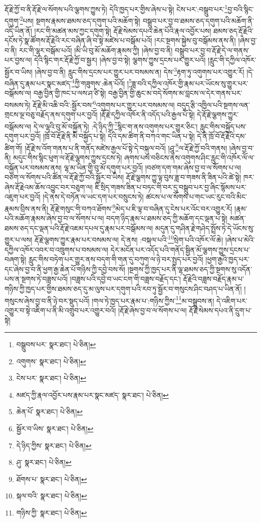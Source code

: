 རྡོ་རྗེ་ཀྱོ་བ་ནི་རྡོ་རྗེ་ལ་སོགས་པའི་ལྕགས་ཀྱུས་ཏེ། དེའི་ཁྱད་པར་གྱིས་ཞེས་པ་སྟེ། ངེས་པར་:བསྒྲུབ་པར་\footnote{བསྒྲུབས་པར་  སྣར་ཐང་།  པེ་ཅིན། }བྱ་བའི་སྙིང་དགུག་\footnote{འགུགས་  སྣར་ཐང་།  པེ་ཅིན། }པས། སྔགས་རྣམས་ཐམས་ཅད་དགུག་པའི་མཆོག་སྟེ། བསྒྲུབ་པར་བྱ་བ་ཐམས་ཅད་དགུག་པའི་མཆོག་ནི་འདི་ཡིན་ནོ། །རང་གི་མཚན་མས་ཀྱང་དགུག་སྟེ། རྡོ་རྗེ་སེམས་དཔའ་ཆེན་པོའི་རྣལ་འབྱོར་པས། ཐམས་ཅད་རྡོ་རྗེའི་དངོས་ཏེ་སྣ་ཚོགས་རྡོ་རྗེའི་རང་བཞིན་ཞི་བ་སྟེ་མཛེས་པ་བསྒོམ་པའོ། །རང་སྔགས་སྐྱེས་བུ་བསྒོམས་ནས་ནི། །ཞེས་བྱ་བ་ནི། རང་གི་ལྷར་བསྒོམ་པའོ། །མི་ཡི་བུ་མོ་མཆོག་རྣམས་ཀྱི། །ཞེས་བྱ་བ་ནི། བསྒྲུབ་པར་བྱ་བ་རྡོ་རྗེ་དེ་ལ་གནས་པར་བྱས་ལ། དེའི་སྙིང་གར་རྡོ་རྗེ་ཀྱོ་བ་སྦྱར། །ཞེས་བྱ་བ་སྟེ། ལྕགས་ཀྱུས་དྲངས་པར་གྱུར་པའོ། །རླུང་གི་དཀྱིལ་འཁོར་སྦྱོར་བ་ཡིས། །ཞེས་བྱ་བ་ནི། རླུང་གིས་དྲངས་པར་གྱུར་པར་བསམས་ན། དེས་\footnote{ངེས་པར་  སྣར་ཐང་།  པེ་ཅིན། }རྟག་ཏུ་འགུགས་པར་འགྱུར་རོ། །དེ་བཞིན་དུ་རྣམ་པར་སྣང་མཛད་\footnote{མཛད་ཀྱི་རྣལ་འབྱོར་པས་རྣམ་པར་སྣང་མཛད་  སྣར་ཐང་།  པེ་ཅིན། }ཀྱི་གཟུགས་:ཆེན་པོའོ། །\footnote{ཆེན་པོ་  སྣར་ཐང་།  པེ་ཅིན། }ཟླ་བའི་དཀྱིལ་འཁོར་གྱི་རྣམ་པར་ཡོངས་སུ་གྱུར་པར་བསྒོམས་ལ། བརྒྱ་བྱིན་གྱི་ཁང་པ་ལས་ཤ་ཙི་སྟེ། བརྒྱ་བྱིན་གྱི་ཆུང་མ་བདེ་སོགས་མ་བླངས་ལ་དེར་གནས་པར་བསམས་ཏེ། རྡོ་རྗེ་མི་འཆི་བའི་:སྦྱོར་བས་\footnote{སྦྱོར་བ་ཡིས་  སྣར་ཐང་།  པེ་ཅིན། }འགུགས་པར་གྱུར་པར་བསམས་ལ། བདུད་རྩི་འཁྱིལ་པའི་སྔགས་ལན་གྲངས་ལྔ་བཅུ་བརྗོད་ནས་དགུག་པར་བྱའོ། །རྡོ་རྗེ་དཀྱིལ་འཁོར་ནི་འདོད་པའི་རྒྱལ་པོ་སྟེ། དེ་རྡོ་རྗེ་ལྕགས་ཀྱུར་བསྒོམས་ལ། དེ་ལ་ལྷའི་བུ་མོ་བསྐྱོན་ཏེ། :དེ་ཉིད་ཀྱི་\footnote{དེ་ཉིད་ཀྱིས་  སྣར་ཐང་།  པེ་ཅིན། }སྙིང་ག་ནས་འགུགས་པར་གྱུར་ཅིང་། རླུང་གིས་བསྐྱོད་པས་དགུག་པར་བྱའོ། །ཁྲོ་བོ་རྡོ་རྗེ་ནི་མི་བསྐྱོད་པ་སྟེ། དེའི་དམ་ཚིག་ནི་བཀའ་གང་ཡིན་པ་སྟེ། དེ་ནི་ཁྲོ་བོ་རྡོ་རྗེའི་དམ་ཚིག་གོ། །རྡོ་རྗེ་ས་འོག་གནས་པ་ནི་གནོད་མཛེས་རྒྱལ་པོ་སྟེ་དེ་བསྐུལ་བའོ། །ཤཱུ་\footnote{ཤུ་  སྣར་ཐང་།  པེ་ཅིན། }ལ་རྡོ་རྗེ་ཀྱོ་བའི་གནས། །ཞེས་བྱ་བ་ནི། མདུང་གིས་སྙིང་ཕུག་ལ་རྡོ་རྗེ་ལྕགས་ཀྱུས་དྲངས་ཏེ། ཞགས་པས་བཅིངས་ནས་འགུགས་ཤིང་རླུང་གི་འཁོར་ལོ་ལ་བསྐྱོན་པར་བསམས་ནས། ལྷ་མ་ཡིན་གྱི་བུ་མོ་དགུག་པར་བྱའོ། །བཙག་དག་གམ་ཞེས་བྱ་བ་ལ་སོགས་པ་ལ། བཙག་ལ་སོགས་པའི་ཚོན་ལ་རྡོ་རྗེ་ཀྱོ་བའི་སྦྱོར་བ་ཡིས། རྡོ་རྗེ་ལྕགས་ཀྱུ་ལྟ་བུས་ཟླ་བ་གཟས་ནི་ཟིན་པའི་ཚེ་སྟེ། ཁར་ཞེས་རྡོ་རྗེའམ་ཆོས་འབྱུང་བར་བཅུག་ལ། ཇི་སྲིད་གཟས་ཟིན་པ་བཏང་གི་བར་དུ་བསྒྲུབ་པར་བྱ་ཞིང་སྙོམས་པར་འཇུག་པར་བྱའོ། །དེ་ནས་དེ་བཏོན་ལ་ཡང་དག་པར་བསྲུངས་ཏེ། ཚངས་པ་ལ་སོགས་པ་གང་ཡང་རུང་བའི་མིང་རྣམས་བྲིས་ནས་ནི། རྡོ་རྗེ་གསུང་གི་བཀའ་ཐོགས་\footnote{ཐོགས་པ་  སྣར་ཐང་།  པེ་ཅིན། }མེད་པ་ཇི་ལྟ་བ་བཞིན་དུ་ངེས་པར་འོང་བར་འགྱུར་རོ། །རྣམ་པའི་མཆོག་རྣམས་ཞེས་བྱ་བ་ལ་སོགས་པ་ལ། བདག་ཉིད་རྣམ་པ་ཐམས་ཅད་ཀྱི་མཆོག་དང་ལྡན་པ་སྟེ། མཚན་ཐམས་ཅད་དང་ལྡན་པའི་རྡོ་རྗེ་འཇམ་དཔལ་དུ་རྣམ་པར་བསྒོམས་ལ། མདུན་དུ་གཤིན་རྗེ་གཤེད་སྤྲོས་ཏེ་དེ་ཡོངས་སུ་གྱུར་པ་ལས། རྡོ་རྗེ་ལྕགས་ཀྱུར་རྣམ་པར་བསམས་ལ། དེ་ནས། :བསྐལ་པའི་\footnote{སྐལ་བའི་  སྣར་ཐང་།  པེ་ཅིན། }སྲེག་པའི་འཁོར་ལོ་ཆེ། །ཞེས་པ་མེའི་དཀྱིལ་འཁོར་འབར་བ་འཁྲུགས་པ་བསམས་ལ། དེར་མངོན་པར་འདོད་པའི་གནོད་སྦྱིན་མོ་ལྕགས་ཀྱུས་དྲངས་པ་བཞག་སྟེ། རླུང་གིས་བཏེག་པར་གྱུར་ནས་བདག་གི་གན་དུ་བཀུག་ལ་ཉེ་བར་སྤྱད་པར་བྱའོ། །ཕྱག་རྒྱའི་ཁྱད་པར་དང་ཞེས་བྱ་བ་ནི་ཕྱག་རྒྱ་ཆེན་པོ་གཉིས་ཀྱི་དབྱེ་བས་སོ། །སྔགས་ཀྱི་ཁྱད་པར་ནི་ལྷ་ཐམས་ཅད་ཀྱི་སྔགས་སུ་འདོན་པས་ན་སྔགས་ཏེ་བཟླས་པའོ། །བཟླས་པའི་དབྱེ་བ་ཡང་ངག་གི་བཟླས་བརྗོད་དང་། རྡོ་རྗེའི་བཟླས་བརྗོད་རྣམ་པ་གཉིས་ཀྱི་ཁྱད་པར་གྱིས་ཐམས་ཅད་དུ་མ་ལུས་པར་དགུག་པའི་རབ་ཏུ་སྦྱོར་བ་གསུངས་ཤིང་བཤད་པ་ཡིན་ནོ། །གསུངས་ཞེས་བྱ་བ་ནི་ཉེ་བར་སྡུད་པའོ། །གལ་ཏེ་ཁྱད་པར་རྣམ་པ་:གཉིས་ཀྱིས་\footnote{གཉིས་ཀྱི་  སྣར་ཐང་།  པེ་ཅིན། }མ་བསྒྲུབས་ན། དེ་འཇིག་པར་འགྱུར་བ་སྟེ་འཇིག་པ་ནི་མི་འགྲུབ་པར་འགྱུར་བའོ། །རྡོ་རྗེ་ཞེས་བྱ་བ་ལ་སོགས་པ་ལ། རྡོ་རྗེ་སེམས་དཔའ་ནི་དྲུག་པ་སྟེ། 